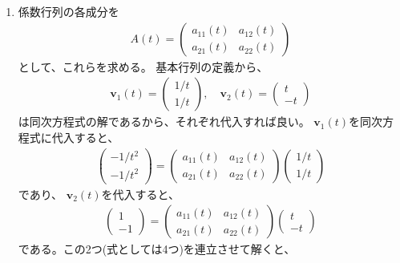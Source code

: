 \documentclass[fleqn]{jsarticle}
\begin{document}
\begin{enumerate}
\item 係数行列の各成分を
\begin{eqnarray}
A(t)=\left(
\begin{array}{cc}
a_{11}(t) & a_{12}(t)\\
a_{21}(t) & a_{22}(t)
\end{array}\right)
\end{eqnarray}
として、これらを求める。
基本行列の定義から、
\begin{eqnarray}
\boldsymbol{v}_{1}(t)=\left(
\begin{array}{c}
1/t\\
1/t
\end{array}
\right),\quad
\boldsymbol{v}_{2}(t)=\left(
\begin{array}{c}
t\\
-t
\end{array}
\right)
\end{eqnarray}
は同次方程式の解であるから、それぞれ代入すれば良い。
$\boldsymbol{v}_{1}(t)$を同次方程式に代入すると、
\begin{eqnarray}
\left(
\begin{array}{c}
-1/t^{2}\\
-1/t^{2}
\end{array}\right)=
\left(
\begin{array}{cc}
a_{11}(t) & a_{12}(t)\\
a_{21}(t) & a_{22}(t)
\end{array}\right)
\left(
\begin{array}{c}
1/t\\
1/t
\end{array}\right)
\end{eqnarray}
であり、
$\boldsymbol{v}_{2}(t)$を代入すると、
\begin{eqnarray}
\left(
\begin{array}{c}
1\\
-1
\end{array}\right)=
\left(
\begin{array}{cc}
a_{11}(t) & a_{12}(t)\\
a_{21}(t) & a_{22}(t)
\end{array}\right)
\left(
\begin{array}{c}
t\\
-t
\end{array}\right)
\end{eqnarray}
である。この2つ(式としては4つ)を連立させて解くと、
\begin{eqnarray}

\end{eqnarray}
\end{enumerate}
\end{document}
